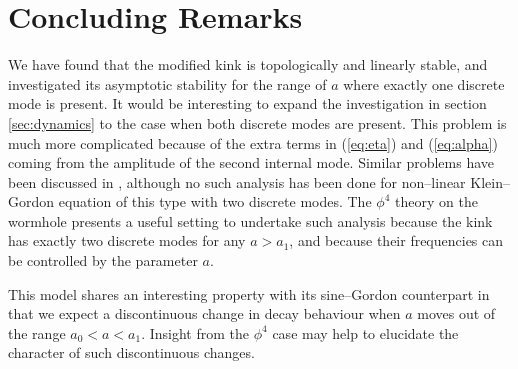 \chapter{Concluding Remarks}

We have found that the modified kink is topologically and linearly stable, and investigated its asymptotic stability for the range of $a$ where exactly one discrete mode is present. It would be interesting to expand the investigation in section \ref{sec:dynamics} to the case when both discrete modes are present. This problem is much more complicated because of the extra terms in (\ref{eq:eta}) and (\ref{eq:alpha}) coming from the amplitude of the second internal mode. Similar problems have been discussed in \cite{Weinstein}, although no such analysis has been done for non--linear Klein--Gordon equation of this type with two discrete modes. The $\phi^4$ theory on the wormhole presents a useful setting to undertake such analysis because the kink has exactly two discrete modes for any $a>a_1$, and because their frequencies can be controlled by the parameter $a$.

This model shares an interesting property with its sine--Gordon counterpart in that we expect a discontinuous change in decay behaviour when $a$ moves out of the range $a_0<a<a_1$. Insight from the $\phi^4$ case may help to elucidate the character of such discontinuous changes.